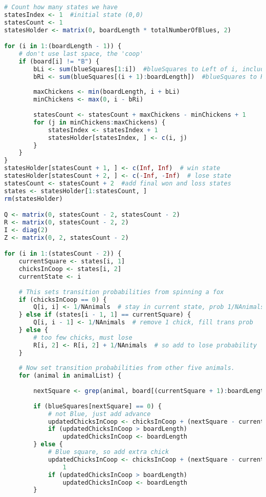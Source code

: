 \begin{description}
\begin{lstlisting}[language=R]
# Count how many states we have
statesIndex <- 1  #initial state (0,0)
statesCount <- 1
statesHolder <- matrix(0, boardLength * totalNumberOfBlues, 2)

for (i in 1:(boardLength - 1)) {
    # don't use last space, the 'coop'
    if (board[i] != "B") {
        bLi <- sum(blueSquares[1:i])  #blueSquares to Left of i, including i
        bRi <- sum(blueSquares[(i + 1):boardLength])  #blueSquares to Right of i
        
        maxChickens <- min(boardLength, i + bLi)
        minChickens <- max(0, i - bRi)
        
        statesCount <- statesCount + maxChickens - minChickens + 1
        for (j in minChickens:maxChickens) {
            statesIndex <- statesIndex + 1
            statesHolder[statesIndex, ] <- c(i, j)
        }
    }
}
statesHolder[statesCount + 1, ] <- c(Inf, Inf)  # win state
statesHolder[statesCount + 2, ] <- c(-Inf, -Inf)  # lose state
statesCount <- statesCount + 2  #add final won and loss states
states <- statesHolder[1:statesCount, ]
rm(statesHolder)

Q <- matrix(0, statesCount - 2, statesCount - 2)
R <- matrix(0, statesCount - 2, 2)
I <- diag(2)
Z <- matrix(0, 2, statesCount - 2)

for (i in 1:(statesCount - 2)) {
    currentSquare <- states[i, 1]
    chicksInCoop <- states[i, 2]
    currentState <- i
    
    # This sets transition probabilities from spinning a fox
    if (chicksInCoop == 0) {
        Q[i, i] <- 1/NAnimals  # stay in current state, prob 1/NAnimals
    } else if (states[i - 1, 1] == currentSquare) {
        Q[i, i - 1] <- 1/NAnimals  # remove 1 chick, fill trans prob
    } else {
        # too few chicks, must lose
        R[i, 2] <- R[i, 2] + 1/NAnimals  # so add to lose probability
    }
    
    # Now set transition probabilities from other five animals.
    for (animal in animalList) {
        
        nextSquare <- grep(animal, board[(currentSquare + 1):boardLength])[1] + currentSquare
        
        if (blueSquares[nextSquare] == 0) {
            # not Blue, just add advance
            updatedChicksInCoop <- chicksInCoop + (nextSquare - currentSquare)
            if (updatedChicksInCoop > boardLength) 
                updatedChicksInCoop <- boardLength
        } else {
            # Blue square, so add extra chick
            updatedChicksInCoop <- chicksInCoop + (nextSquare - currentSquare) + 
                1
            if (updatedChicksInCoop > boardLength) 
                updatedChicksInCoop <- boardLength
        }
        

\end{lstlisting}
\end{description}
